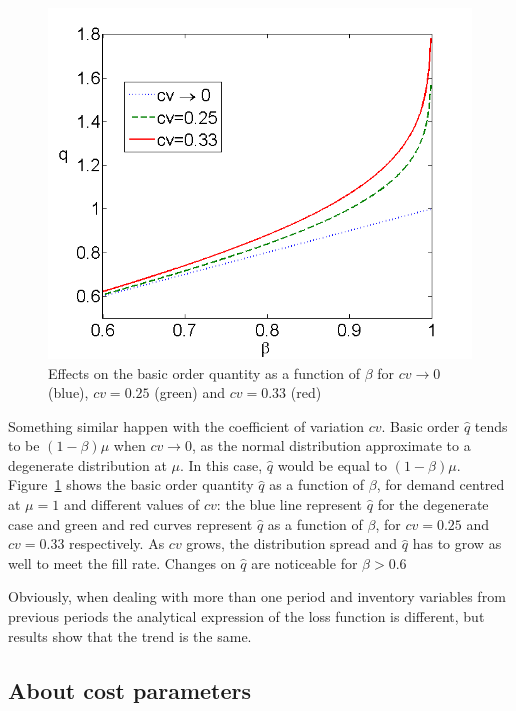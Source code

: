 {\begin{figure}[!ht]
\centering
\includegraphics[scale=0.30]{iccsa2015/figures/qnbeta.png}
\caption{Effects on the basic order quantity as a function of $\beta$ for $cv \rightarrow 0$ (blue), $cv=0.25$ (green) and $cv=0.33$ (red)}
\label{fig:qnbeta}
\end{figure}

Something similar happen with the coefficient of variation $cv$. Basic order $\hat{q}$ tends to be $(1-\beta)\mu$  when $cv \rightarrow 0$, as the normal distribution approximate to a degenerate distribution at $\mu$. In this case, $\hat q$ would be equal to $(1-\beta)\mu$.  Figure~\ref{fig:qnbeta} shows the basic order quantity $\hat q$ as a function of $\beta$, for demand centred at $\mu=1$ and different values of $cv$: the blue line represent $\hat q$ for the degenerate case and green and red curves represent $\hat q$ as a function of $\beta$, for $cv=0.25$ and $cv=0.33$ respectively. As $cv$ grows, the distribution spread and $\hat{q}$ has to grow as well to meet the fill rate. Changes on $\hat q$ are noticeable for  $\beta>0.6$


Obviously, when dealing with more than one period and inventory variables from previous periods the analytical expression of the loss function is different, but results show that the trend is the same.

\subsection{About cost parameters}

}
